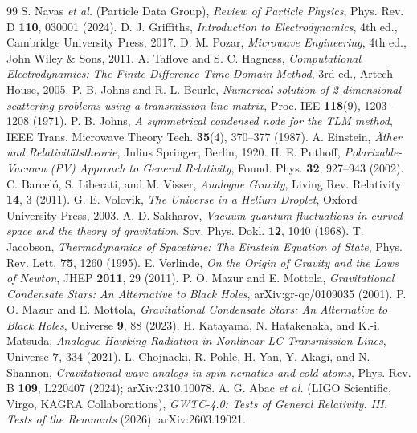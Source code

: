 \documentclass[11pt,a4paper]{article}
\theoremstyle{plain}
\theoremstyle{remark}
\begin{document}
\begin{thebibliography}{99}
 S. Navas \textit{et al.} (Particle Data Group), \textit{Review of Particle Physics}, Phys. Rev. D \textbf{110}, 030001 (2024).
 D. J. Griffiths, \textit{Introduction to Electrodynamics}, 4th ed., Cambridge University Press, 2017.
 D. M. Pozar, \textit{Microwave Engineering}, 4th ed., John Wiley \& Sons, 2011.
 A. Taflove and S. C. Hagness, \textit{Computational Electrodynamics: The Finite-Difference Time-Domain Method}, 3rd ed., Artech House, 2005.
 P. B. Johns and R. L. Beurle, \textit{Numerical solution of 2-dimensional scattering problems using a transmission-line matrix}, Proc. IEE \textbf{118}(9), 1203--1208 (1971).
 P. B. Johns, \textit{A symmetrical condensed node for the TLM method}, IEEE Trans. Microwave Theory Tech. \textbf{35}(4), 370--377 (1987).
 A. Einstein, \textit{\"Ather und Relativit\"atstheorie}, Julius Springer, Berlin, 1920.
 H. E. Puthoff, \textit{Polarizable-Vacuum (PV) Approach to General Relativity}, Found. Phys. \textbf{32}, 927--943 (2002).
 C. Barcel\'o, S. Liberati, and M. Visser, \textit{Analogue Gravity}, Living Rev. Relativity \textbf{14}, 3 (2011).
 G. E. Volovik, \textit{The Universe in a Helium Droplet}, Oxford University Press, 2003.
 A. D. Sakharov, \textit{Vacuum quantum fluctuations in curved space and the theory of gravitation}, Sov. Phys. Dokl. \textbf{12}, 1040 (1968).
 T. Jacobson, \textit{Thermodynamics of Spacetime: The Einstein Equation of State}, Phys. Rev. Lett. \textbf{75}, 1260 (1995).
 E. Verlinde, \textit{On the Origin of Gravity and the Laws of Newton}, JHEP \textbf{2011}, 29 (2011).
 P. O. Mazur and E. Mottola, \textit{Gravitational Condensate Stars: An Alternative to Black Holes}, arXiv:gr-qc/0109035 (2001).
 P. O. Mazur and E. Mottola, \textit{Gravitational Condensate Stars: An Alternative to Black Holes}, Universe \textbf{9}, 88 (2023).
 H. Katayama, N. Hatakenaka, and K.-i. Matsuda, \textit{Analogue Hawking Radiation in Nonlinear LC Transmission Lines}, Universe \textbf{7}, 334 (2021).
 L. Chojnacki, R. Pohle, H. Yan, Y. Akagi, and N. Shannon, \textit{Gravitational wave analogs in spin nematics and cold atoms}, Phys. Rev. B \textbf{109}, L220407 (2024); arXiv:2310.10078.
 A. G. Abac \textit{et al.} (LIGO Scientific, Virgo, KAGRA Collaborations), \textit{GWTC-4.0: Tests of General Relativity. III. Tests of the Remnants} (2026). arXiv:2603.19021.


\end{thebibliography}
\end{document}
